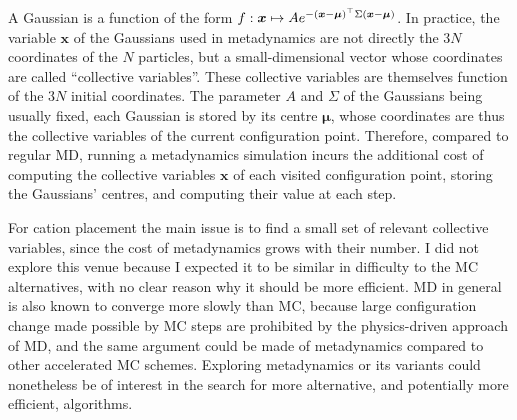 \documentclass[main.tex]{subfiles}
\begin{document}
A Gaussian is a function of the form $f:\boldsymbol x\mapsto Ae^{-\left(\boldsymbol x - \boldsymbol\mu\right)^\top\Sigma\left(\boldsymbol x - \boldsymbol\mu\right)}$. In practice, the variable $\boldsymbol x$ of the Gaussians used in metadynamics are not directly the $3N$ coordinates of the $N$ particles, but a small-dimensional vector whose coordinates are called ``collective variables''. These collective variables are themselves function of the $3N$ initial coordinates. The parameter $A$ and $\Sigma$ of the Gaussians being usually fixed, each Gaussian is stored by its centre $\boldsymbol\mu$, whose coordinates are thus the collective variables of the current configuration point. Therefore, compared to regular MD, running a metadynamics simulation incurs the additional cost of computing the collective variables $\boldsymbol x$ of each visited configuration point, storing the Gaussians' centres, and computing their value at each step.

For cation placement the main issue is to find a small set of relevant collective variables, since the cost of metadynamics grows with their number. I did not explore this venue because I expected it to be similar in difficulty to the MC alternatives, with no clear reason why it should be more efficient. MD in general is also known to converge more slowly than MC, because large configuration change made possible by MC steps are prohibited by the physics-driven approach of MD, and the same argument could be made of metadynamics compared to other accelerated MC schemes. Exploring metadynamics or its variants could nonetheless be of interest in the search for more alternative, and potentially more efficient, algorithms.

\OnlyInSubfile{\printglobalbibliography}
\end{document}
